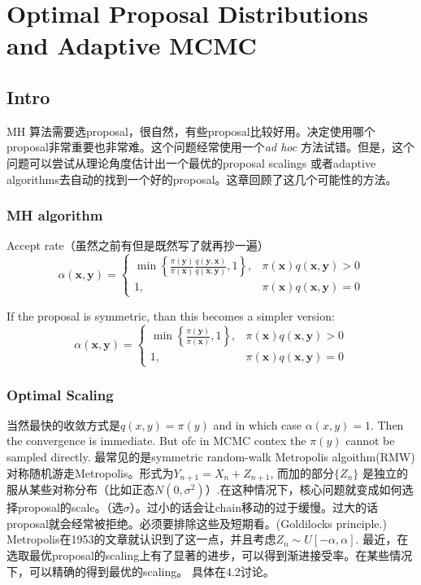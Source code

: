 \documentclass[
]{book}
\theoremstyle{definition}
\theoremstyle{definition}
\theoremstyle{definition}
\theoremstyle{remark}
\begin{document}
\hypertarget{optimal-proposal-distributions-and-adaptive-mcmc}{%
\chapter{Optimal Proposal Distributions and Adaptive MCMC}\label{optimal-proposal-distributions-and-adaptive-mcmc}}

\hypertarget{intro}{%
\section{Intro}\label{intro}}

MH 算法需要选proposal，很自然，有些proposal比较好用。决定使用哪个proposal非常重要也非常难。这个问题经常使用一个\emph{ad hoc} 方法试错。但是，这个问题可以尝试从理论角度估计出一个最优的proposal scalings 或者adaptive algorithms去自动的找到一个好的proposal。这章回顾了这几个可能性的方法。

\hypertarget{mh-algorithm}{%
\subsection{MH algorithm}\label{mh-algorithm}}

Accept rate（虽然之前有但是既然写了就再抄一遍）
\[
\alpha(\mathbf{x}, \mathbf{y})=\left\{\begin{array}{ll}{\min \left\{\frac{\pi(\mathbf{y})}{\pi(\mathbf{x})} \frac{q(\mathbf{y}, \mathbf{x})}{q(\mathbf{x}, \mathbf{y})}, 1\right\},} & {\pi(\mathbf{x}) q(\mathbf{x}, \mathbf{y})>0} \\ {1,} & {\pi(\mathbf{x}) q(\mathbf{x}, \mathbf{y})=0}\end{array}\right.
\]

If the proposal is symmetric, than this becomes a simpler version:
\[
\alpha(\mathbf{x}, \mathbf{y})=\left\{\begin{array}{ll}{\min \left\{\frac{\pi(\mathbf{y})}{\pi(\mathbf{x})}, 1\right\},} & {\pi(\mathbf{x}) q(\mathbf{x}, \mathbf{y})>0} \\ {1,} & {\pi(\mathbf{x}) q(\mathbf{x}, \mathbf{y})=0}\end{array}\right.
\]

\hypertarget{optimal-scaling}{%
\subsection{Optimal Scaling}\label{optimal-scaling}}

当然最快的收敛方式是\(q(x,y)=\pi(y)\) and in which case \(\alpha(x,y)=1\). Then the convergence is immediate. But ofc in MCMC contex the \(\pi(y)\) cannot be sampled directly. 最常见的是symmetric random-walk Metropolis algoithm(RMW)对称随机游走Metropolis。形式为\(Y_{n+1}=X_n+Z_{n+1}\), 而加的部分\(\{Z_n\}\) 是独立的服从某些对称分布（比如正态\(N(0,\sigma^2)\)）.在这种情况下，核心问题就变成如何选择proposal的scale。（选\(\sigma\)）。过小的话会让chain移动的过于缓慢。过大的话proposal就会经常被拒绝。必须要排除这些及短期看。(Goldilocks principle.)
Metropolis在1953的文章就认识到了这一点，并且考虑\(Z_{n} \sim U[-\alpha, \alpha]\). 最近，在选取最优proposal的scaling上有了显著的进步，可以得到渐进接受率。在某些情况下，可以精确的得到最优的scaling。
具体在4.2讨论。
\end{document}
